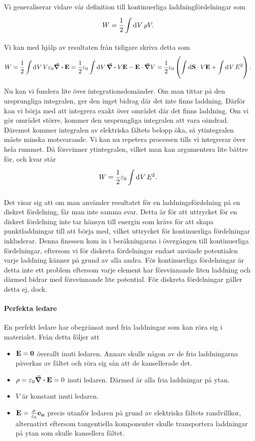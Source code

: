 Vi generaliserar vidare vår definition till kontinuerliga laddningfördelningar som
\begin{align*}
	W = \frac{1}{2}\int\limits_{}^{}\dd[]{V}\rho V.
\end{align*}
Vi kan med hjälp av resultaten från tidigare skriva detta som
\begin{align*}
	W = \frac{1}{2}\int\limits_{}^{}\dd[]{V}V\varepsilon_{0}\div{\vb{E}} = \frac{1}{2}\varepsilon_{0}\int\limits_{}^{}\dd[]{V}\div{V\vb{E}} - \vb{E}\cdot\grad{V} = \frac{1}{2}\varepsilon_{0}\left(\int\limits_{}^{}\dd{\vb{S}}\cdot V\vb{E} + \int\limits_{}^{}\dd[]{V}E^{2}\right).
\end{align*}

Nu kan vi fundera lite över integrationsdomänder. Om man tittar på den ursprungliga integralen, ger den inget bidrag där det inte finns laddning. Därför kan vi börja med att integrera exakt över området där det finns laddning. Om vi gör området större, kommer den ursprungliga integralen att vara oändrad. Däremot kommer integralen av elektriska fältets belopp öka, så ytintegralen måste minska motsvarande. Vi kan nu repetera processen tills vi integrerar över hela rummet. Då försvinner ytintegralen, vilket man kan argumentera lite bättre för, och kvar står
\begin{align*}
	W = \frac{1}{2}\varepsilon_{0}\int\limits_{}^{}\dd[]{V}E^{2}.
\end{align*}

Det visar sig att om man använder resultatet för en laddningsfördelning på en diskret fördelning, får man inte samma svar. Detta är för att uttrycket för en diskret fördelning inte tar hänsyn till energin som krävs för att skapa punktladdningar till att börja med, vilket uttrycket för kontinuerliga fördelningar inkluderar. Denna finessen kom in i beräkningarna i övergången till kontinuerliga fördelningar, eftersom vi för diskreta fördelningar endast använde potentialen varje laddning känner på grund av alla andra. För kontinuerliga fördelningar är detta inte ett problem eftersom varje element har försvinnande liten laddning och därmed bidrar med försvinnande lite potential. För diskreta fördelningar gäller detta ej, dock.

\paragraph{Perfekta ledare}
En perfekt ledare har obegränsat med fria laddningar som kan röra sig i materialet. Från detta följer att
\begin{itemize}
	\item $\vb{E} = \vb{0}$ överallt inuti ledaren. Annars skulle någon av de fria laddningarna påverkas av fältet och röra sig sån att de kansellerade det.
	\item $\rho = \varepsilon_{0}\div{\vb{E}} = 0$ inuti ledaren. Därmed är alla fria laddningar på ytan.
	\item $V$ är konstant inuti ledaren.
	\item $\vb{E} = \frac{\sigma}{\varepsilon_{0}}\vb{e}_{\vb{n}}$ precis utanför ledaren på grund av elektriska fältets randvillkor, alternativt eftersom tangentiella komponenter skulle transportera laddningar på ytan som skulle kansellera fältet.
\end{itemize}

